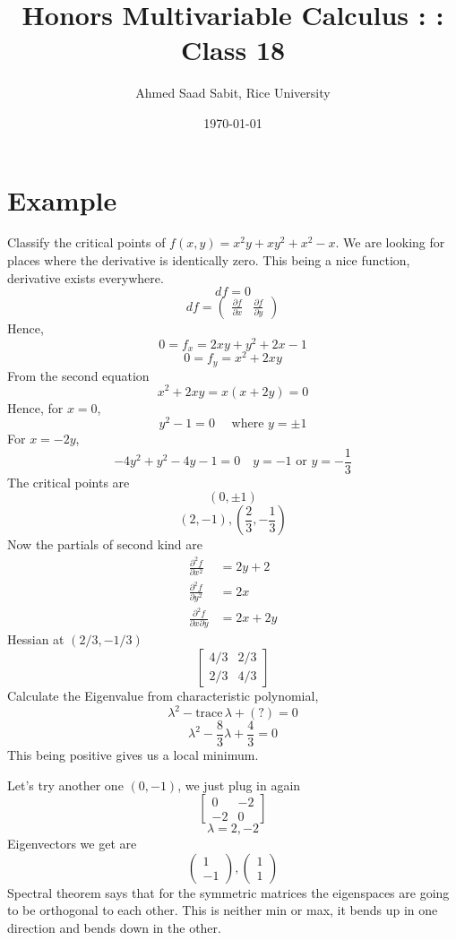 \documentclass[letter]{article}
\title{Honors Multivariable Calculus : : Class 18}
\author{Ahmed Saad Sabit, Rice University}
\date{\today}
\begin{document}
\maketitle
\section*{Example}
Classify the critical points of $f(x,y) = x^2 y + xy^2 + x^2 - x$. We are looking for places where the derivative is identically zero. This being a nice function, derivative exists everywhere. 
\[
df{
 = 0
}
\] 
\[
	d f = \begin{pmatrix} \frac{\partial f}{\partial x} & \frac{\partial f }{\partial y} \end{pmatrix} 
\] 
Hence, 
\[
0 = f_x = 2xy + y^2 + 2x - 1
\] 
\[
0 = f_y = x^2 + 2 xy 
\] 
From the second equation
\[
x^2 + 2 xy = x ( x+ 2y) = 0
\] 
Hence, for $x = 0$, 
\[
y^2 - 1 = 0 \quad \text{ where } y = \pm 1
\] 
For $x = -2y$,
\[
-4y^2 + y^2 -4 y - 1 = 0 \quad y = -1 \text{ or } y = - \frac{1}{3}
\]
The critical points are 
\[
	(0, \pm 1)
\]
\[
	(2, -1) , (\frac{2}{3}, -\frac{1}{3})
\]
Now the partials of second kind are
\begin{align*}
	\frac{\partial^2f}{\partial x^2} &= 2y + 2 \\
	\frac{\partial ^2 f}{\partial y^2} &= 2x \\
	\frac{\partial ^2 f}{\partial x \partial y} &= 2 x + 2y 
\end{align*}
Hessian at $( 2 / 3, - {1} / {3})$ 
\[
	\begin{bmatrix} 4 / 3 & 2 / 3 \\ 
	2 / 3 & 4 /3 \end{bmatrix} 
\]
Calculate the Eigenvalue from characteristic polynomial, 
\[
\lambda^2 - \text{trace} \, \lambda + (?) = 0 
\]
\[
\lambda^2 - \frac{8}{3} \lambda + \frac{4}{3} = 0
\]
This being positive gives us a local minimum.

Let's try another one $(0,-1)$, we just plug in again
\[
	\begin{bmatrix} 0 & -2 \\ -2 & 0 \end{bmatrix} 
\] 
\[
\lambda = 2, -2 
\]
Eigenvectors we get are
\[
\begin{pmatrix} 1 \\ -1 \end{pmatrix} , \begin{pmatrix} 1 \\ 1 \end{pmatrix} 
\]
Spectral theorem says that for the symmetric matrices the eigenspaces are going to be orthogonal to each other. This is neither min or max, it bends up in one direction and bends down in the other. 
\end{document}
